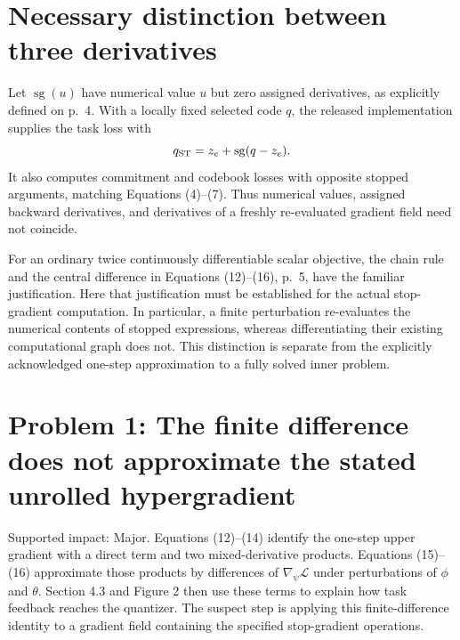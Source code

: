 \documentclass[10pt]{article}
\begin{document}
\section*{Necessary distinction between three derivatives}
Let \(\operatorname{sg}(u)\) have numerical value \(u\) but zero assigned derivatives, as explicitly defined on p. 4. With a locally fixed selected code \(q\), the released implementation supplies the task loss with \[q_{\rm ST}=z_e+\operatorname{sg}(q-z_e).\] It also computes commitment and codebook losses with opposite stopped arguments, matching Equations (4)–(7). Thus numerical values, assigned backward derivatives, and derivatives of a freshly re-evaluated gradient field need not coincide.\par
For an ordinary twice continuously differentiable scalar objective, the chain rule and the central difference in Equations (12)–(16), p. 5, have the familiar justification. Here that justification must be established for the actual stop-gradient computation. In particular, a finite perturbation re-evaluates the numerical contents of stopped expressions, whereas differentiating their existing computational graph does not. This distinction is separate from the explicitly acknowledged one-step approximation to a fully solved inner problem.\par
\section*{Problem 1: The finite difference does not approximate the stated unrolled hypergradient}
Supported impact: Major. Equations (12)–(14) identify the one-step upper gradient with a direct term and two mixed-derivative products. Equations (15)–(16) approximate those products by differences of \(\nabla_\psi\mathcal L\) under perturbations of \(\phi\) and \(\theta\). Section 4.3 and Figure 2 then use these terms to explain how task feedback reaches the quantizer. The suspect step is applying this finite-difference identity to a gradient field containing the specified stop-gradient operations.\par
\end{document}

